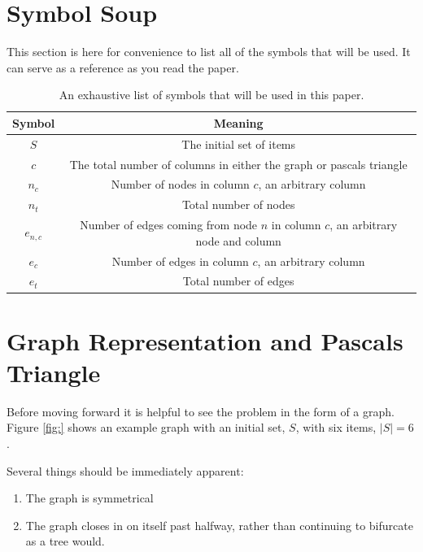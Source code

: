 \documentclass{article}
\begin{document}
\section{Symbol Soup}
\label{sec:SymbolSoup}

This section is here for convenience to list all of the symbols that will be used. It can serve as a reference as you read the paper.

\begin{table}[h]
    \centering
    \begin{tabular}{|c|c|}
        \hline
        Symbol &  Meaning \\
        \hline
        $S$ & The initial set of items \\
        \hline
        $c$ & The total number of columns in either the graph or pascals triangle \\
        \hline
        $n_c$ & Number of nodes in column $c$, an arbitrary column \\
        \hline
        $n_t$ & Total number of nodes \\
        \hline
        $e_{n,c}$ & Number of edges coming from node $n$ in column $c$, an arbitrary node and column \\
        \hline
        $e_c$ & Number of edges in column $c$, an arbitrary column \\
        \hline
        $e_t$ & Total number of edges \\
        \hline
    \end{tabular}
    \caption{An exhaustive list of symbols that will be used in this paper.}
    \label{tab:symbolList}
\end{table}

\section{Graph Representation and Pascals Triangle}
\label{sec:GraphAndPascalsTriangle}

Before moving forward it is helpful to see the problem in the form of a graph. Figure \ref{fig:} shows an example graph with an initial set, $S$, with six items, $|S|=6$.

Several things should be immediately apparent:
\begin{enumerate}
    \item The graph is symmetrical
    \item The graph closes in on itself past halfway, rather than continuing to bifurcate as a tree would.
\end{enumerate}
\end{document}
